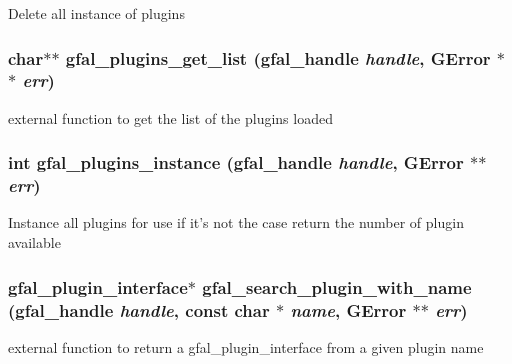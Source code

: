 Delete all instance of plugins 
\subsubsection{\setlength{\rightskip}{0pt plus 5cm}char$\ast$$\ast$ gfal\_\-plugins\_\-get\_\-list (gfal\_\-handle {\em handle}, GError $\ast$$\ast$ {\em err})}\label{gfal__common__plugin_8c_59f53151c28e45f965a554a2a6806ad6}


external function to get the list of the plugins loaded 
\subsubsection{\setlength{\rightskip}{0pt plus 5cm}int gfal\_\-plugins\_\-instance (gfal\_\-handle {\em handle}, GError $\ast$$\ast$ {\em err})\hspace{0.3cm}{\tt  [inline]}}\label{gfal__common__plugin_8c_4d38083d4b9f51095013c0f3d233c0da}


Instance all plugins for use if it's not the case return the number of plugin available 
\subsubsection{\setlength{\rightskip}{0pt plus 5cm}\bf{gfal\_\-plugin\_\-interface}$\ast$ gfal\_\-search\_\-plugin\_\-with\_\-name (gfal\_\-handle {\em handle}, const char $\ast$ {\em name}, GError $\ast$$\ast$ {\em err})}\label{gfal__common__plugin_8c_bd45330c7e213e68805dbb1505101275}


external function to return a gfal\_\-plugin\_\-interface from a given plugin name 